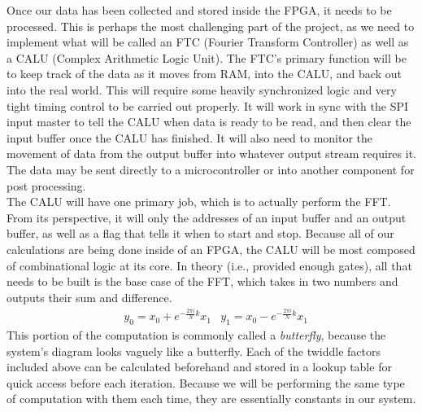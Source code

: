 \documentclass[12pt]{article}
\begin{document}
    Once our data has been collected and stored inside the FPGA, it needs to be processed.
    This is perhaps the most challenging part of the project, as we need to implement what will be called an FTC (Fourier Transform Controller) as well as a CALU (Complex Arithmetic Logic Unit).
    The FTC's primary function will be to keep track of the data as it moves from RAM, into the CALU, and back out into the real world.
    This will require some heavily synchronized logic and very tight timing control to be carried out properly.
    It will work in sync with the SPI input master to tell the CALU when data is ready to be read, and then clear the input buffer once the CALU has finished.
    It will also need to monitor the movement of data from the output buffer into whatever output stream requires it.
    The data may be sent directly to a microcontroller or into another component for post processing.\\

    The CALU will have one primary job, which is to actually perform the FFT.
    From its perspective, it will only the addresses of an input buffer and an output buffer, as well as a flag that tells it when to start and stop.
    Because all of our calculations are being done inside of an FPGA, the CALU will be most composed of combinational logic at its core.
    In theory (i.e., provided enough gates), all that needs to be built is the base case of the FFT, which takes in two numbers and outputs their sum and difference.
    \begin{align*}
        &y_0 = x_0 + e^{-\frac{2\pi i}{N}k}x_1
        &y_1 = x_0 - e^{-\frac{2\pi i}{N}k}x_1
    \end{align*}
    This portion of the computation is commonly called a \textit{butterfly}, because the system's diagram looks vaguely like a butterfly.
    Each of the twiddle factors included above can be calculated beforehand and stored in a lookup table for quick access before each iteration.
    Because we will be performing the same type of computation with them each time, they are essentially constants in our system.\\
\end{document}
